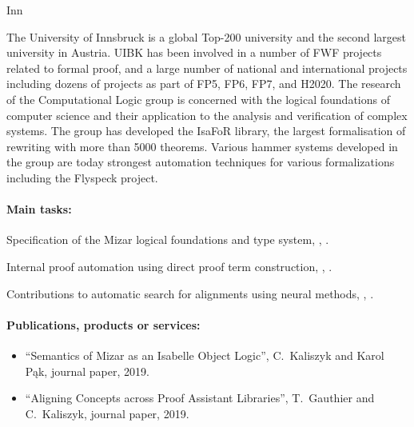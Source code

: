 \begin{sitedescription}{Inn}

The University of Innsbruck is a global Top-200 university and the second
largest university in Austria. UIBK has been involved in a number of FWF
projects related to formal proof, and a large number of national and
international projects including dozens of projects as part of FP5,
FP6, FP7, and H2020.
%
The research of the Computational Logic group is concerned with the logical
foundations of computer science and their application to the analysis and
verification of complex systems. The group has developed the IsaFoR library,
the largest formalisation of rewriting with more than 5000 theorems. Various
hammer systems developed in the group are today strongest automation techniques
for various formalizations including the Flyspeck project.

\paragraph{Main tasks:}

\begin{compactitem}
\item Specification of the Mizar logical foundations and type system, , .
\item Internal proof automation using direct proof term construction, %
  , .
\item Contributions to automatic search for alignments using neural methods, , .
\end{compactitem}

\paragraph{Publications, products or services:}
\begin{itemize}
\item ``Semantics of Mizar as an Isabelle Object Logic'', C.~Kaliszyk and Karol Pąk,
journal paper, 2019.

\item ``Aligning Concepts across Proof Assistant Libraries'', T.~Gauthier and C.~Kaliszyk, journal paper, 2019.


\end{itemize}
\end{sitedescription}
